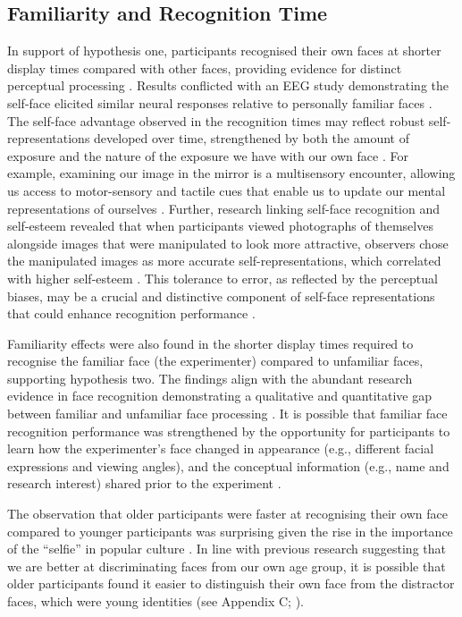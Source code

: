\documentclass[
  10pt,
  letterpaper,
]{article}
\begin{document}
\subsection{Familiarity and Recognition
Time}\label{familiarity-and-recognition-time}

In support of hypothesis one, participants recognised their own faces at
shorter display times compared with other faces, providing evidence for
distinct perceptual processing \citep{alzueta2019a, rooney2012a}.
Results conflicted with an EEG study demonstrating the self-face
elicited similar neural responses relative to personally familiar faces
\citep{wiese2021a}. The self-face advantage observed in the recognition
times may reflect robust self-representations developed over time,
strengthened by both the amount of exposure and the nature of the
exposure we have with our own face \citep{bortolon2017a, tong1999a}. For
example, examining our image in the mirror is a multisensory encounter,
allowing us access to motor-sensory and tactile cues that enable us to
update our mental representations of ourselves \citep{bortolon2017a}.
Further, research linking self-face recognition and self-esteem revealed
that when participants viewed photographs of themselves alongside images
that were manipulated to look more attractive, observers chose the
manipulated images as more accurate self-representations, which
correlated with higher self-esteem \citep{felisberti2014a}. This
tolerance to error, as reflected by the perceptual biases, may be a
crucial and distinctive component of self-face representations that
could enhance recognition performance \citep{felisberti2014a}.

Familiarity effects were also found in the shorter display times
required to recognise the familiar face (the experimenter) compared to
unfamiliar faces, supporting hypothesis two. The findings align with the
abundant research evidence in face recognition demonstrating a
qualitative and quantitative gap between familiar and unfamiliar face
processing \citep{burton2013a, burton2016a, ramon2017a}. It is possible
that familiar face recognition performance was strengthened by the
opportunity for participants to learn how the experimenter's face
changed in appearance (e.g., different facial expressions and viewing
angles), and the conceptual information (e.g., name and research
interest) shared prior to the experiment \citep{dowsett2016a}.

The observation that older participants were faster at recognising their
own face compared to younger participants was surprising given the rise
in the importance of the ``selfie'' in popular culture
\citep{tshidzumba2019a}. In line with previous research suggesting that
we are better at discriminating faces from our own age group, it is
possible that older participants found it easier to distinguish their
own face from the distractor faces, which were young identities (see
Appendix C; \citet{rhodes2012a}).
\end{document}
